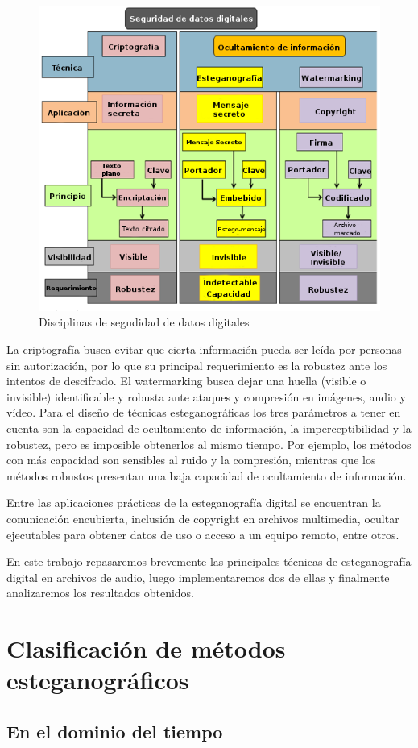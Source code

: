 \documentclass[conference,a4paper,10pt, oneside,final]{tfmpd}
\begin{document}
\begin{figure}[h!]
 \centering
 \includegraphics[keepaspectratio=true, width=250 px]{./cuadro.png}
 \caption{Disciplinas de segudidad de datos digitales}
 \label{fig: Disciplinas de segudidad de datos digitales}
\end{figure}

La criptografía busca evitar que cierta información pueda ser leída por personas sin autorización, por lo que su principal requerimiento es la robustez ante los intentos de descifrado. El watermarking busca dejar una huella (visible o invisible) identificable y robusta ante ataques y compresión en imágenes, audio y vídeo. Para el diseño de técnicas esteganográficas los tres parámetros a tener en cuenta son la capacidad de ocultamiento de información, la imperceptibilidad y la robustez, pero es imposible obtenerlos al mismo tiempo. Por ejemplo, los métodos con más capacidad son sensibles al ruido y la compresión, mientras que los métodos robustos presentan una baja capacidad de ocultamiento de información.

Entre las aplicaciones prácticas de la esteganografía digital se encuentran la conunicación encubierta, inclusión de copyright en archivos multimedia, ocultar ejecutables para obtener datos de uso o acceso a un equipo remoto, entre otros.

En este trabajo repasaremos brevemente las principales técnicas de esteganografía digital en archivos de audio, luego implementaremos dos de ellas y finalmente analizaremos los resultados obtenidos.

\section{Clasificación de métodos esteganográficos}

\subsection{En el dominio del tiempo}
\end{document}
